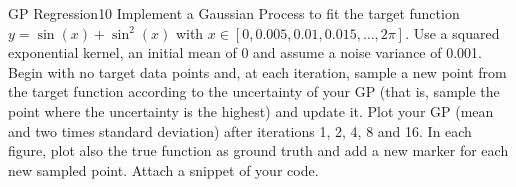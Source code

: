 \newif\ifvimbug
\vimbugfalse

\ifvimbug

\fi

\begin{questions}


\begin{question}{GP Regression}{10}
Implement a Gaussian Process to fit the target function $y = \sin(x) + \sin^2(x)$ with $x \in [0, 0.005, 0.01, 0.015, \ldots, 2\pi]$. Use a squared exponential kernel, an initial mean of 0 and assume a noise variance of 0.001. Begin with no target data points and, at each iteration, sample a new point from the target function according to the uncertainty of your GP (that is, sample the point where the uncertainty is the highest) and update it. Plot your GP (mean and two times standard deviation) after iterations 1, 2, 4, 8 and 16.
In each figure, plot also the true function as ground truth and add a new marker for each new sampled point. Attach a snippet of your code.

\begin{answer}\end{answer}

\end{question}


\end{questions}
